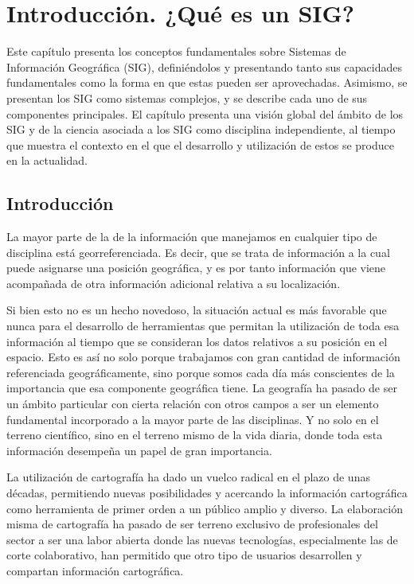 
\chapter{Introducción. ¿Qué es un SIG?}
\label{Introduccion_fundamentos}



\bigskip

\begin{intro}
Este capítulo presenta los conceptos fundamentales sobre Sistemas de Información Geográfica (SIG), definiéndolos y presentando tanto sus capacidades fundamentales como la forma en que estas pueden ser aprovechadas. Asimismo, se presentan los SIG como sistemas complejos, y se describe cada uno de sus componentes principales. El capítulo presenta una visión global del ámbito de los SIG y de la ciencia asociada a los SIG como disciplina independiente, al tiempo que muestra el contexto en el que el desarrollo y utilización de estos se produce en la actualidad.
\end{intro}

\section{Introducción}
\pagestyle{fancy}

La mayor parte de la de la información que manejamos en cualquier tipo de disciplina está georreferenciada. Es decir, que se trata de información a la cual puede asignarse una posición geográfica, y es por tanto información que viene acompañada de otra información adicional relativa a su localización. 

Si bien esto no es un hecho novedoso, la situación actual es más favorable que nunca para el desarrollo de herramientas que permitan la utilización de toda esa información al tiempo que se consideran los datos relativos a su posición en el espacio. Esto es así no solo porque trabajamos con gran cantidad de información referenciada geográficamente, sino porque somos cada día más conscientes de la importancia que esa componente geográfica tiene. La geografía ha pasado de ser un ámbito particular con cierta relación con otros campos a ser un elemento fundamental incorporado a la mayor parte de las disciplinas. Y no solo en el terreno científico, sino en el terreno mismo de la vida diaria, donde toda esta información desempeña un papel de gran importancia.

La utilización de cartografía ha dado un vuelco radical en el plazo de unas décadas, permitiendo nuevas posibilidades y acercando la información cartográfica como herramienta de primer orden a un público amplio y diverso. La elaboración misma de cartografía ha pasado de ser terreno exclusivo de profesionales del sector a ser una labor abierta donde las nuevas tecnologías, especialmente las de corte colaborativo, han permitido que otro tipo de usuarios desarrollen y compartan información cartográfica.

